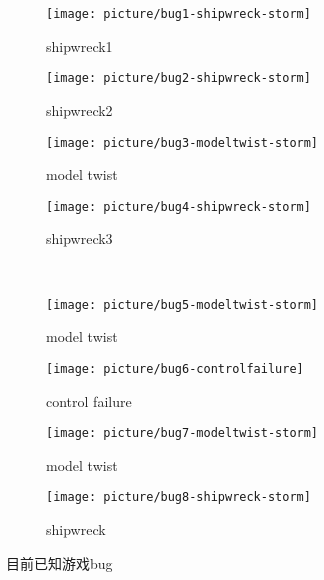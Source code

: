 \documentclass[a4paper,10pt]{article}
\begin{document}
		\begin{figure}[htbp] 
			\centering 
			
			\begin{subfigure}{0.23\textwidth}
				\texttt{[image: picture/bug1-shipwreck-storm]}
				\captionsetup{font=scriptsize}
				\caption{shipwreck1}
				\label{fig: bug1-shipwreck-storm}
			\end{subfigure}
			\begin{subfigure}{0.23\textwidth}
				\texttt{[image: picture/bug2-shipwreck-storm]}
				\captionsetup{font=scriptsize}
				\caption{shipwreck2}
				\label{fig: bug2-shipwreck-storm}
			\end{subfigure}
			\begin{subfigure}{0.23\textwidth}
				\texttt{[image: picture/bug3-modeltwist-storm]}
				\captionsetup{font=scriptsize}
				\caption{model twist}
				\label{fig: bug3-modeltwist-storm}
			\end{subfigure}
			\begin{subfigure}{0.23\textwidth}
				\texttt{[image: picture/bug4-shipwreck-storm]}
				\captionsetup{font=scriptsize}
				\caption{shipwreck3}
				\label{fig: bug4-shipwreck-storm}
			\end{subfigure} \\
			
			\begin{subfigure}{0.23\textwidth}
				\texttt{[image: picture/bug5-modeltwist-storm]}
				\captionsetup{font=scriptsize}
				\caption{model twist}
				\label{fig: bug5-modeltwist-storm}
			\end{subfigure}
			\begin{subfigure}{0.23\textwidth}
				\texttt{[image: picture/bug6-controlfailure]}
				\captionsetup{font=scriptsize}
				\caption{control failure}
				\label{fig: bug6-controlfailure}
			\end{subfigure}
			\begin{subfigure}{0.23\textwidth}
				\texttt{[image: picture/bug7-modeltwist-storm]}
				\captionsetup{font=scriptsize}
				\caption{model twist}
				\label{fig: bug7-modeltwist-storm}
			\end{subfigure}
			\begin{subfigure}{0.23\textwidth}
				\texttt{[image: picture/bug8-shipwreck-storm]}
				\captionsetup{font=scriptsize}
				\caption{shipwreck}
				\label{fig: bug8-shipwreck-storm}
			\end{subfigure}
			
			\captionsetup{font=scriptsize}
			\caption{
				\label{fig: bug}	
				目前已知游戏bug				
			}
		\end{figure}
\end{document}
